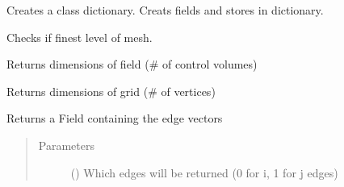 \documentclass[letterpaper,10pt,english]{sphinxmanual}
\begin{document}
\begin{fulllineitems}
\begin{fulllineitems}
\begin{itemize}
\end{itemize}

\sphinxAtStartPar
Creates a class dictionary.
Creats fields and stores in dictionary.

\end{fulllineitems}


\begin{fulllineitems}
\label{\detokenize{autoapi/Workspace/index:Workspace.Workspace.is_finest}}
\sphinxAtStartPar
Checks if finest level of mesh.

\end{fulllineitems}


\begin{fulllineitems}
\label{\detokenize{autoapi/Workspace/index:Workspace.Workspace.field_size}}
\sphinxAtStartPar
Returns dimensions of field (\# of control volumes)

\end{fulllineitems}


\begin{fulllineitems}
\label{\detokenize{autoapi/Workspace/index:Workspace.Workspace.grid_size}}
\sphinxAtStartPar
Returns dimensions of grid (\# of vertices)

\end{fulllineitems}


\begin{fulllineitems}
\label{\detokenize{autoapi/Workspace/index:Workspace.Workspace.edges}}
\sphinxAtStartPar
Returns a Field containing the edge vectors
\begin{quote}\begin{description}
\item[{Parameters}] \leavevmode
\sphinxAtStartPar
{} () \textendash{} Which edges will be returned (0 for i, 1 for j edges)


\end{description}
\end{quote}
\end{fulllineitems}
\end{fulllineitems}
\end{document}
